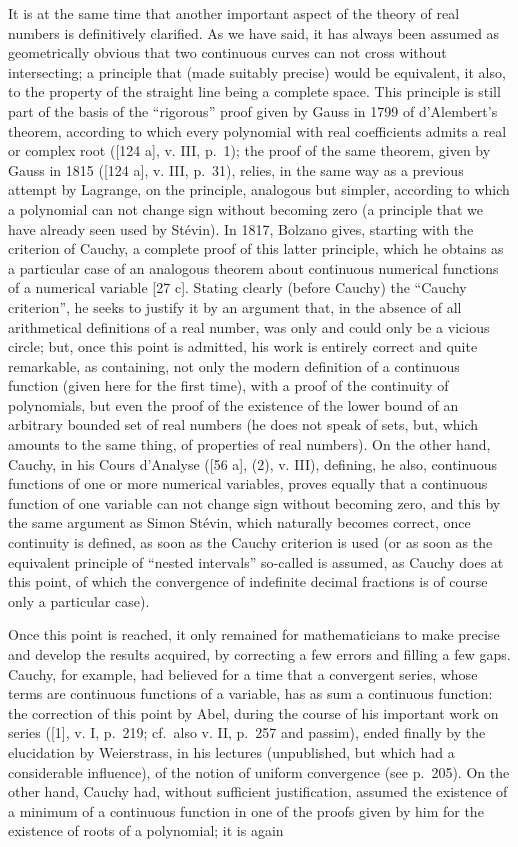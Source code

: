 It is at the same time that another important aspect of the theory of real numbers is definitively clarified. As we have said, it has always been assumed as geometrically obvious that two continuous curves can not cross without intersecting; a principle that (made suitably precise) would be equivalent, it also, to the property of the straight line being a complete space. This principle is still part of the basis of the ``rigorous'' proof given by Gauss in 1799 of d'Alembert's theorem, according to which every polynomial with real coefficients admits a real or complex root ({[}124 a{]}, v. III, p.~1); the proof of the same theorem, given by Gauss in 1815 ({[}124 a{]}, v. III, p.~31), relies, in the same way as a previous attempt by Lagrange, on the principle, analogous but simpler, according to which a polynomial can not change sign without becoming zero (a principle that we have already seen used by Stévin). In 1817, Bolzano gives, starting with the criterion of Cauchy, a complete proof of this latter principle, which he obtains as a particular case of an analogous theorem about continuous numerical functions of a numerical variable {[}27 c{]}. Stating clearly (before Cauchy) the ``Cauchy criterion'', he seeks to justify it by an argument that, in the absence of all arithmetical definitions of a real number, was only and could only be a vicious circle; but, once this point is admitted, his work is entirely correct and quite remarkable, as containing, not only the modern definition of a continuous function (given here for the first time), with a proof of the continuity of polynomials, but even the proof of the existence of the lower bound of an arbitrary bounded set of real numbers (he does not speak of sets, but, which amounts to the same thing, of properties of real numbers). On the other hand, Cauchy, in his Cours d'Analyse ({[}56 a{]}, (2), v. III), defining, he also, continuous functions of one or more numerical variables, proves equally that a continuous function of one variable can not change sign without becoming zero, and this by the same argument as Simon Stévin, which naturally becomes correct, once continuity is defined, as soon as the Cauchy criterion is used (or as soon as the equivalent principle of ``nested intervals'' so-called is assumed, as Cauchy does at this point, of which the convergence of indefinite decimal fractions is of course only a particular case).

Once this point is reached, it only remained for mathematicians to make precise and develop the results acquired, by correcting a few errors and filling a few gaps. Cauchy, for example, had believed for a time that a convergent series, whose terms are continuous functions of a variable, has as sum a continuous function: the correction of this point by Abel, during the course of his important work on series ({[}1{]}, v. I, p.~219; cf.~also v. II, p.~257 and passim), ended finally by the elucidation by Weierstrass, in his lectures (unpublished, but which had a considerable influence), of the notion of uniform convergence (see p.~205). On the other hand, Cauchy had, without sufficient justification, assumed the existence of a minimum of a continuous function in one of the proofs given by him for the existence of roots of a polynomial; it is again

